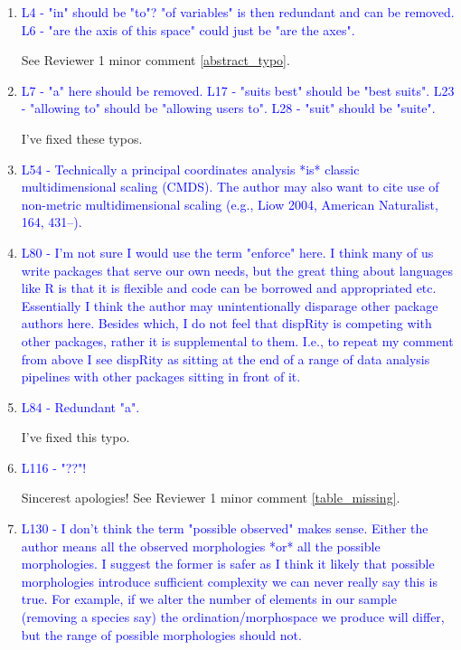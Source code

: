 \documentclass[12pt,letterpaper]{article}
\begin{document}
\begin{enumerate}

\item{\textcolor{blue}{L4 - "in" should be "to"? "of variables" is then redundant and can be removed. L6 - "are the axis of this space" could just be "are the axes".}}

See Reviewer 1 minor comment \ref{abstract_typo}.

\item{\textcolor{blue}{L7 - "a" here should be removed. L17 - "suits best" should be "best suits". L23 - "allowing to" should be "allowing users to". L28 - "suit" should be "suite".}}

I've fixed these typos.


\item{\textcolor{blue}{L54 - Technically a principal coordinates analysis *is* classic multidimensional scaling (CMDS). The author may also want to cite use of non-metric multidimensional scaling (e.g., Liow 2004, American Naturalist, 164, 431–).}}


\item{\textcolor{blue}{L80 - I'm not sure I would use the term "enforce" here. I think many of us write packages that serve our own needs, but the great thing about languages like R is that it is flexible and code can be borrowed and appropriated etc. Essentially I think the author may unintentionally disparage other package authors here. Besides which, I do not feel that dispRity is competing with other packages, rather it is supplemental to them. I.e., to repeat my comment from above I see dispRity as sitting at the end of a range of data analysis pipelines with other packages sitting in front of it.}}


\item{\textcolor{blue}{L84 - Redundant "a".}}

I've fixed this typo.

\item{\textcolor{blue}{L116 - "??"!}}

Sincerest apologies! See Reviewer 1 minor comment \ref{table_missing}.

\item{\textcolor{blue}{L130 - I don't think the term "possible observed" makes sense. Either the author means all the observed morphologies *or* all the possible morphologies. I suggest the former is safer as I think it likely that possible morphologies introduce sufficient complexity we can never really say this is true. For example, if we alter the number of elements in our sample (removing a species say) the ordination/morphospace we produce will differ, but the range of possible morphologies should not.}}


\end{enumerate}
\end{document}
